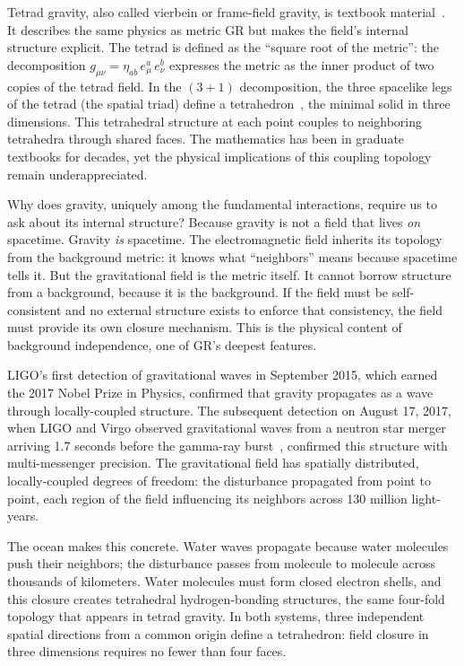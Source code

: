 \documentclass[aps,prd,preprint,superscriptaddress,showpacs,preprintnumbers,amsmath,amssymb,nofootinbib]{revtex4-2}
\begin{document}
Tetrad gravity, also called vierbein or frame-field gravity, is textbook material~\cite{mtw1973,wald1984}. It describes the same physics as metric GR but makes the field's internal structure explicit. The tetrad is defined as the ``square root of the metric'': the decomposition $g_{\mu\nu} = \eta_{ab}\,e^a_\mu\,e^b_\nu$ expresses the metric as the inner product of two copies of the tetrad field. In the $(3{+}1)$ decomposition, the three spacelike legs of the tetrad (the spatial triad) define a tetrahedron~\cite{barbieri1998}, the minimal solid in three dimensions. This tetrahedral structure at each point couples to neighboring tetrahedra through shared faces. The mathematics has been in graduate textbooks for decades, yet the physical implications of this coupling topology remain underappreciated.

Why does gravity, uniquely among the fundamental interactions, require us to ask about its internal structure? Because gravity is not a field that lives \emph{on} spacetime. Gravity \emph{is} spacetime. The electromagnetic field inherits its topology from the background metric: it knows what ``neighbors'' means because spacetime tells it. But the gravitational field is the metric itself. It cannot borrow structure from a background, because it is the background. If the field must be self-consistent and no external structure exists to enforce that consistency, the field must provide its own closure mechanism. This is the physical content of background independence, one of GR's deepest features.

LIGO's first detection of gravitational waves in September 2015, which earned the 2017 Nobel Prize in Physics, confirmed that gravity propagates as a wave through locally-coupled structure. The subsequent detection on August 17, 2017, when LIGO and Virgo observed gravitational waves from a neutron star merger arriving 1.7 seconds before the gamma-ray burst~\cite{gw170817}, confirmed this structure with multi-messenger precision. The gravitational field has spatially distributed, locally-coupled degrees of freedom: the disturbance propagated from point to point, each region of the field influencing its neighbors across 130 million light-years.

The ocean makes this concrete. Water waves propagate because water molecules push their neighbors; the disturbance passes from molecule to molecule across thousands of kilometers. Water molecules must form closed electron shells, and this closure creates tetrahedral hydrogen-bonding structures, the same four-fold topology that appears in tetrad gravity. In both systems, three independent spatial directions from a common origin define a tetrahedron: field closure in three dimensions requires no fewer than four faces.
\end{document}
